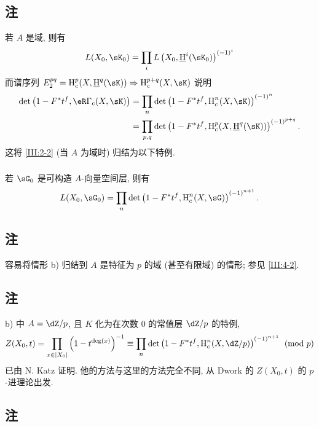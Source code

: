 \subsection{注}\label{III:2-4}

若 $A$ 是域, 则有
\[
  L(X_0,\sK_0) = \prod_i L\left(X_0,\underline\h^i(\sK_0)\right)^{(-1)^i}
\]
而谱序列 $E_2^{p q} = \h_c^p(X,\underline\h^q(\sK))\Rightarrow \h_c^{p+q}(X,\sK)$ 说明
\begin{align*}
  \det\left(1-F^* t^f, \eR\Gamma_c(X,\sK)\right)
    &= \prod_n \det\left(1-F^* t^f,\h_c^n(X,\sK)\right)^{(-1)^n} \\
    &= \prod_{p,q} \det\left(1-F^* t^f,\h_c^p(X,\underline\h^q(\sK))\right)^{(-1)^{p+q}} \text{.}
\end{align*}
这将 \ref{III:2-2} (当 $A$ 为域时) 归结为以下特例.

\subsubsection{}\label{III:2-4-1}

若 $\sG_0$ 是可构造 $A$-向量空间层, 则有
\[
  L(X_0,\sG_0) = \prod_n \det\left(1-F^* t^f,\h_c^n(X,\sG)\right)^{(-1)^{n+1}} \text{.}
\]

\subsection{注}\label{III:2-5}

容易将情形 b) 归结到 $A$ 是特征为 $p$ 的域 (甚至有限域) 的情形; 参见 \ref{III:4-2}.

\subsection{注}\label{III:2-6}

b) 中 $A=\dZ/p$, 且 $K$ 化为在次数 $0$ 的常值层 $\dZ/p$ 的特例,
\[
  Z(X_0,t) = \prod_{x\in |X_0|} \left(1-t^{\deg(x)}\right)^{-1}
      \equiv \prod_n \det\left(1-F^* t^f,\h_c^n(X,\dZ/p)\right)^{(-1)^{n+1}} \pmod p
\]
已由 N. Katz \cite[XXII 3.1]{sga7} 证明. 他的方法与这里的方法完全不同, 从 Dwork 的 $Z(X_0,t)$ 的 $p$-进理论出发.

\subsection{注}\label{III:2-7}

